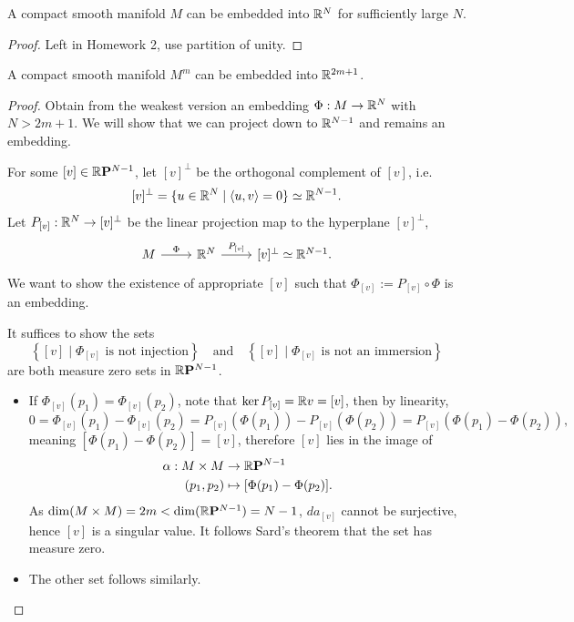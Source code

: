 \begin{theorem}
  A compact smooth manifold \(M\) can be embedded into \(\mathbb{R}^N\) for sufficiently large \(N\).
\end{theorem}
\begin{proof}
  Left in Homework 2, use partition of unity.
\end{proof}

\begin{theorem}
  A compact smooth manifold \(M^m\) can be embedded into \(\mathbb{R}^{2m+1}\).
\end{theorem}
\begin{proof}
  Obtain from the weakest version an embedding \(\Phi:M\to\mathbb{R}^N\) with \(N > 2m+1\).
  We will show that we can project down to \(\mathbb{R}^{N-1}\) and remains an embedding.

  For some \([v]\in\mathbb{R}\mathbf{P}^{N-1}\), let \([v]^\perp\) be the orthogonal complement of \([v]\), i.e. \[
    [v]^\perp = \{u\in\mathbb{R}^N\mid \langle u,v\rangle = 0\} \simeq \mathbb{R}^{N-1}.
  \]
  Let \(P_{[v]}:\mathbb{R}^N\to [v]^\perp\) be the linear projection map to the hyperplane \([v]^\perp\), \[
    \begin{tikzcd}
      M \ar{r}{\Phi} &\R^N \ar{r}{P_{[v]}} &\lbrack v\rbrack^\perp \simeq\R^{N-1}.
    \end{tikzcd}
  \]
  We want to show the existence of appropriate \([v]\) such that \(\Phi_{[v]} := P_{[v]}\circ\Phi\) is an embedding.
  \begin{roof}
    It suffices to show the sets \[
      \left\{[v] \mid \Phi_{[v]} \text{ is not injection}\right\}
      \quad\text{and}\quad
      \left\{[v] \mid \Phi_{[v]} \text{ is not an immersion}\right\}
    \] are both measure zero sets in \(\mathbb{R}\mathbf{P}^{N-1}\).
    \begin{itemize}
      \item If \(\Phi_{[v]}(p_1) = \Phi_{[v]}(p_2)\), note that \(\ker P_{[v]} = \mathbb{R} v = [v]\), then by linearity, \[
        0 = \Phi_{[v]}(p_1) - \Phi_{[v]}(p_2)
        = P_{[v]}(\Phi(p_1)) - P_{[v]}(\Phi(p_2))
        = P_{[v]}(\Phi(p_1) - \Phi(p_2)),
      \] meaning \([\Phi(p_1) - \Phi(p_2)] = [v]\),
      therefore \([v]\) lies in the image of \begin{align*}
        \alpha:M\times M &\to\mathbb{R}\mathbf{P}^{N-1} \\
        (p_1,p_2) &\mapsto [\Phi(p_1) - \Phi(p_2)].
      \end{align*}
      As \(\dim(M\times M) = 2m < \dim(\mathbb{R}\mathbf{P}^{N-1}) = N-1\), \(da_{[v]}\) cannot be surjective, hence \([v]\) is a singular value. It follows Sard's theorem that the set has measure zero.
      \item The other set follows similarly.
    \end{itemize}
  \end{roof}
\end{proof}

